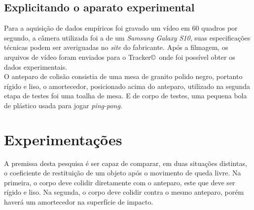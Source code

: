 \documentclass[a4paper, 12pt]{article}
\begin{document}
		\subsection{Explicitando o aparato experimental}
		Para a aquisição de dados empíricos foi gravado um vídeo em 60 quadros por segundo, a câmera utilizada foi a de um \textsl{Samsung Galaxy S10}, suas especificações técnicas podem ser averiguadas no \textsl{site} do fabricante. Após a filmagem, os arquivos de vídeo foram enviados para o Tracker\copyright \, onde foi possível obter os dados experimentais. \\
		O anteparo de colisão consistia de uma mesa de granito polido negro, portanto rígido e liso, o amortecedor, posicionado acima do anteparo, utilizado na segunda etapa de testes foi uma toalha de mesa. E de corpo de testes, uma pequena bola de plástico usada para jogar \textsl{ping-pong}.
		
		
		
		
		
	\newpage
	\section{Experimentações}
		A premissa desta pesquisa é ser capaz de comparar, em duas situações distintas, o coeficiente de restituição de um objeto após o movimento de queda livre. Na primeira, o corpo deve colidir diretamente com o anteparo, este que deve ser rígido e liso. Na segunda, o corpo deve colidir contra o mesmo anteparo, porém haverá um amortecedor na superfície de impacto.
\end{document}

